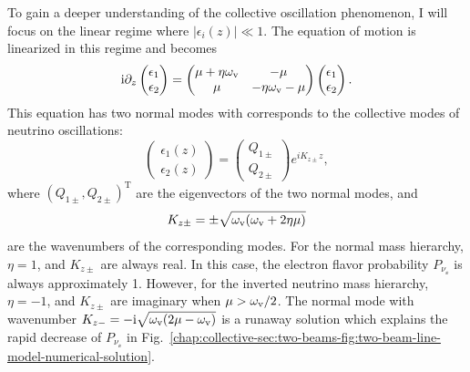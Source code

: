 To gain a deeper understanding of the collective oscillation phenomenon, I will focus on the linear regime where $\lvert \epsilon_i(z) \rvert \ll 1$. The equation of motion is linearized in this regime and becomes
\begin{equation}
    \mathrm{i} \partial_z \begin{pmatrix}
        \epsilon_1 \\
        \epsilon_2
    \end{pmatrix} =  \begin{pmatrix}
        \mu + \eta\omega_\mathrm v & - \mu \\
        \mu & - \eta\omega_\mathrm v - \mu
    \end{pmatrix} \begin{pmatrix}
        \epsilon_1 \\
        \epsilon_2
    \end{pmatrix}.
\end{equation}
This equation has two normal modes with corresponds to the collective modes of neutrino oscillations:
\begin{equation}
    \begin{pmatrix}
        \epsilon_1 (z) \\
        \epsilon_2 (z)
    \end{pmatrix} = \begin{pmatrix}
        Q_{1\pm} \\
        Q_{2\pm}
    \end{pmatrix} e^{i K_{z\pm} z},
    \label{chap:collective-sec:two-beams-eqn:equation-of-motion-collective-mode-assumption}
\end{equation}
where $(Q_{1\pm}, Q_{2\pm})^{\mathrm T}$ are the eigenvectors of the two normal modes, and
\begin{equation}
    K_{z\pm} = \pm \sqrt{ \omega_\mathrm v (\omega_\mathrm v + 2 \eta \mu) }
\end{equation}
are the wavenumbers of the corresponding modes. For the normal mass hierarchy, $\eta = 1$, and $K_{z\pm}$ are always real. In this case, the electron flavor probability $P_{\nu_\ee}$ is always approximately 1. However, for the inverted neutrino mass hierarchy, $\eta=-1$, and $K_{z\pm}$ are imaginary when $\mu > \omega_\mathrm v/2$. The normal mode with wavenumber $K_{z-} = -\mathrm{i} \sqrt{ \omega_\mathrm v (2 \mu-\omega_\mathrm v) }$ is a runaway solution which explains the rapid decrease of $P_{\nu_\ee}$ in Fig.~\ref{chap:collective-sec:two-beams-fig:two-beam-line-model-numerical-solution}.




